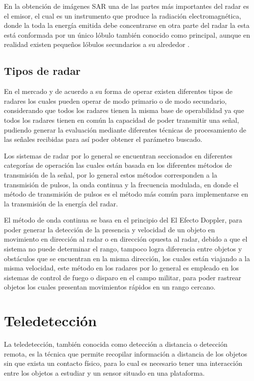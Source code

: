 En la obtención de imágenes SAR una de las partes más importantes del radar es el emisor, el cual es un instrumento que produce la radiación electromagnética, donde la toda la energía emitida debe concentrarse en otra parte del radar la esta está conformada por un único lóbulo también conocido como principal, aunque en realidad existen pequeños lóbulos secundarios a su alrededor \cite{RigoRibas2004}.

\subsection{Tipos de radar}	

En el mercado y de acuerdo a su forma de operar existen diferentes tipos de radares los cuales pueden operar de modo primario o de modo secundario, considerando que todos los radares tienen la misma base de operabilidad ya que todos los radares tienen en común la capacidad de poder transmitir una señal, pudiendo generar la evaluación mediante diferentes técnicas de procesamiento de las señales recibidas para así poder obtener el parámetro buscado. \cite{AcostaOsorio2014Mar}

Los sistemas de radar por lo general se encuentran seccionados en diferentes categorías de operación las cuales están basada en los diferentes métodos de transmisión de la señal, por lo general estos métodos corresponden a la transmisión de pulsos, la onda continua y la frecuencia modulada, en donde el método de transmisión de pulsos es el método más común para implementarse en la transmisión de la energía del radar. 

El método de onda continua se basa en el principio del El Efecto Doppler, para poder generar la detección de la presencia y velocidad de un objeto en movimiento en dirección al radar o en dirección opuesta al radar, debido a que el sistema no puede determinar el rango, tampoco logra diferencia entre objetos y obstáculos que se encuentran en la misma dirección, los cuales están viajando a la misma velocidad, este método en los radares por lo general es empleado en los sistemas de control de fuego o disparo en el campo militar, para poder rastrear objetos los cuales presentan movimientos rápidos en un rango cercano.

\section{Teledetección}

La teledetección, también conocida como detección a distancia o detección remota, es la técnica que permite recopilar información a distancia de los objetos sin que exista un contacto físico, para lo cual es necesario tener una interacción entre los objetos a estudiar y un sensor situado en una plataforma.

